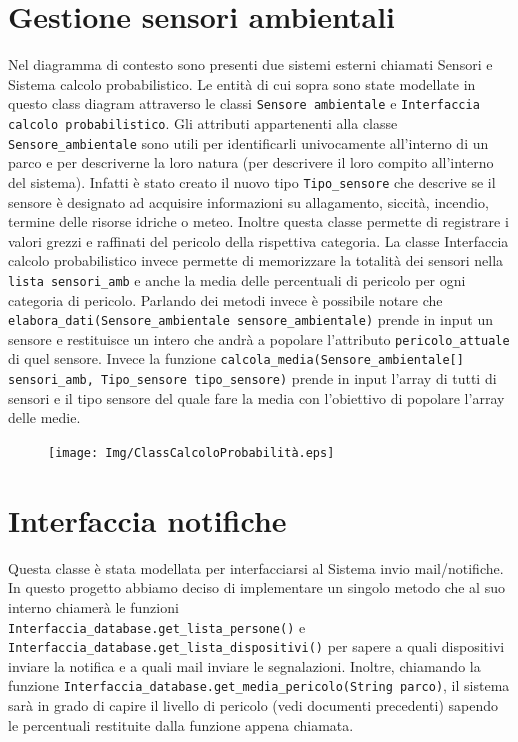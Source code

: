 \section{Gestione sensori ambientali}
Nel diagramma di contesto sono presenti due sistemi esterni chiamati Sensori e Sistema calcolo probabilistico.
Le entità di cui sopra sono state modellate in questo class diagram attraverso le classi \texttt{Sensore ambientale} e \texttt{Interfaccia calcolo probabilistico}.
Gli attributi appartenenti alla classe \texttt{Sensore\_ambientale} sono utili per identificarli univocamente all'interno di un parco e per descriverne la loro natura (per descrivere il loro compito all'interno del sistema). Infatti è stato creato il nuovo tipo \texttt{Tipo\_sensore} che descrive se il sensore è designato ad acquisire informazioni su allagamento, siccità, incendio, termine delle risorse idriche o meteo. Inoltre questa classe permette di registrare i valori grezzi e raffinati del pericolo della rispettiva categoria.
La classe Interfaccia calcolo probabilistico invece permette di memorizzare la totalità dei sensori nella \texttt{lista sensori\_amb} e anche la media delle percentuali di pericolo per ogni categoria di pericolo. Parlando dei metodi invece è possibile notare che \texttt{elabora\_dati(Sensore\_ambientale sensore\_ambientale)} prende in input un sensore e restituisce un intero che andrà a popolare l'attributo \texttt{pericolo\_attuale} di quel sensore. Invece la funzione \texttt{calcola\_media(Sensore\_ambientale[] sensori\_amb, Tipo\_sensore tipo\_sensore)} prende in input l'array di tutti di sensori e il tipo sensore del quale fare la media con l'obiettivo di popolare l'array delle medie.

\begin{figure}[ht]
    \centering
    \texttt{[image: Img/ClassCalcoloProbabilità.eps]}
\end{figure}


\section{Interfaccia notifiche}
Questa classe è stata modellata per interfacciarsi al Sistema invio mail/notifiche. In questo progetto abbiamo deciso di implementare un singolo metodo che al suo interno chiamerà le funzioni \\ \texttt{Interfaccia\_database.get\_lista\_persone()} e \texttt{Interfaccia\_database.get\_lista\_dispositivi()} per sapere a quali dispositivi inviare la notifica e a quali mail inviare le segnalazioni. Inoltre, chiamando la funzione \texttt{Interfaccia\_database.get\_media\_pericolo(String parco)}, il sistema sarà in grado di capire il livello di pericolo (vedi documenti precedenti) sapendo le percentuali restituite dalla funzione appena chiamata.

